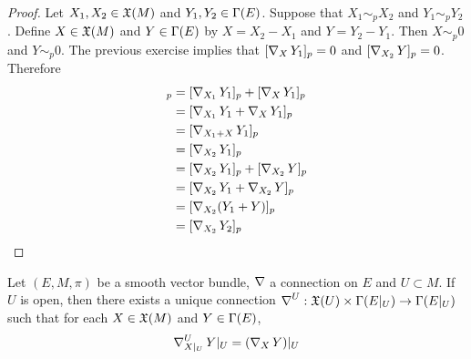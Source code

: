 \documentclass{book}
\begin{document}
	\begin{proof}
		Let $X_1, X_2 \in \mathfrak{X}(M)$ and $Y_1, Y_2 \in \Gamma(E)$. Suppose that $X_1 \sim_p X_2$ and $Y_1 \sim_p Y_2$. Define $X \in \mathfrak{X}(M)$ and $Y \in \Gamma(E)$ by $X = X_2 - X_1$ and $Y = Y_2 - Y_1$. Then $X \sim_p 0$ and $Y \sim_p 0$. The previous exercise implies that $[\operatorname{\nabla}_{X}Y_1]_p = 0$ and $[\operatorname{\nabla}_{X_2} Y]_p = 0$. Therefore
		\begin{align*}
			[\nab_{X_1} Y_1]_p
			& = [\nab_{X_1} Y_1]_p + [\nab_X Y_1]_p \\
			& = [\nab_{X_1} Y_1 + \nab_X Y_1]_p \\
			& = [\nab_{X_1 + X} Y_1]_p \\
			& = [\nab_{X_2} Y_1]_p \\
			& = [\nab_{X_2} Y_1]_p + [\nab_{X_2} Y]_p \\
			& = [\nab_{X_2} Y_1 + \nab_{X_2} Y]_p \\
			& = [\nab_{X_2} (Y_1 + Y)]_p \\
			& = [\nab_{X_2} Y_2]_p \\
		\end{align*}
	\end{proof}

	\begin{ex}
		Let $(E, M, \pi)$ be a smooth vector bundle, $\operatorname{\nabla}$ a connection on $E$ and $U \subset M$. If $U$ is open, then there exists a unique connection $\operatorname{\nabla}^U: \mathfrak{X}(U) \times \Gamma(E|_U) \rightarrow \Gamma(E|_U)$ such that for each $X \in \mathfrak{X}(M)$ and $Y \in \Gamma(E)$, 
		$$\operatorname{\nabla}^U_{X|_U} Y|_U = (\operatorname{\nabla}_X Y)|_U$$
	\end{ex}

	

	
	
	
	
	
	
	
	
\end{document}
